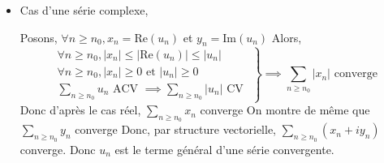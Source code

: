 \documentclass{article}
\renewenvironment{question_kholle}[2][ ]
{
	\subsection{\texorpdfstring{#2}{}}
	\notblank{#1}
	{
		\noindent #1
		\bigbreak
	}
	{}
	\begin{proof}
}
{
	\end{proof}
}
\begin{document}
\begin{question_kholle}
\begin{itemize}[label=$\lozenge$]
\begin{figure}[H]
            \caption{Décomposition de la suite $u$ en $u^+$ et $u^-$, les "partie positive" et "partie négative". Graphiquement, on retrouve $u_n^+ + u_n^- = |u_n|$ et $u_n^+ - u_n^- = u_n$}
          \end{figure}
    \item Cas d'une série complexe,

          Posons, $\forall n\geqslant n_{0}, x_{n} = \mathrm{Re}(u_{n})$ et $y_{n} = \mathrm{Im}(u_{n})$
          Alors,
          $$
            \left. \begin{array}{ll}
              \forall n \geqslant n_{0}, \lvert x_{n} \rvert \leqslant \lvert \mathrm{Re}(u_{n}) \rvert \leqslant \lvert u_{n} \rvert \\
              \forall n\geqslant n_{0}, \lvert  x_{n} \rvert \geqslant 0 \text{ et } \lvert u_{n} \rvert \geqslant 0                  \\
              \sum_{n\geqslant n_{0}}u_{n} \text{ ACV } \implies \sum_{n\geqslant n_{0}}\lvert u_{n} \rvert \text{ CV }
            \end{array}\right\}\implies \sum_{n\geqslant n_{0}}\lvert x_{n} \rvert \text{ converge}
          $$
          Donc d'après le cas réel, $\sum_{n\geqslant n_{0}} x_{n}$ converge
          On montre de même que $\sum_{n\geqslant n_{0}}y_{n}$ converge
          Donc, par structure vectorielle, $\sum_{n\geqslant n_{0}}(x_{n}+ iy_{n})$ converge.
          Donc $u_{n}$ est le terme général d'une série convergente.
        \end{itemize}
        
\end{question_kholle}
\end{document}
